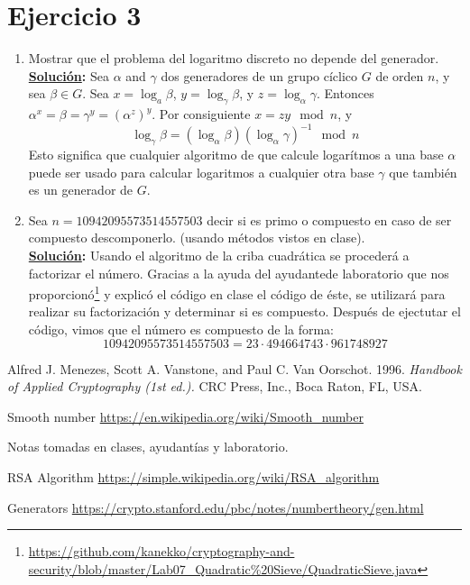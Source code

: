 \documentclass[11pt,letterpaper]{article}
\newcommand{\sol}{\textbf{\underline{Solución}: }} %
\begin{document}
\section{Ejercicio 3}

\begin{enumerate}[label=\alph*)]
\item Mostrar que el problema del logaritmo discreto no depende del generador.\\
\sol Sea $\alpha$ and $\gamma$ dos generadores de un grupo cíclico $G$ de orden $n$, 
y sea $\beta \in G$. Sea $x=\log_a \beta$, $y=\log_\gamma \beta$, y $z = \log_\alpha \gamma$.
Entonces $\alpha^x = \beta = \gamma^y = (\alpha^z)^y$. Por consiguiente $x = zy \mod{n}$, y 
$$\log_\gamma \beta = (\log_\alpha \beta)(\log_\alpha \gamma)^{-1} \mod{n}$$
Esto significa que cualquier algoritmo de que calcule logarítmos a una base $\alpha$ puede ser
usado para calcular logaritmos a cualquier otra base $\gamma$ que también es un generador de $G$.

\item Sea $n = 10942095573514557503$ decir si es primo o compuesto en caso de ser
compuesto descomponerlo. (usando métodos vistos en clase).\\
\sol Usando el algoritmo de la criba cuadrática se procederá a factorizar el número.
Gracias a la ayuda del ayudantede laboratorio que nos proporcionó\footnote{
\url{https://github.com/kanekko/cryptography-and-security/blob/master/Lab07_Quadratic\%20Sieve/QuadraticSieve.java}}
y explicó el código en clase el código de éste, se utilizará para realizar su factorización y determinar si es
compuesto. Después de ejectutar el código, vimos que el número es compuesto de la forma:
$$10942095573514557503 = 23 \cdot 494664743 \cdot 961748927$$

\end{enumerate}



\begin{thebibliography}{}

\bibitem{}
Alfred J. Menezes, Scott A. Vanstone, and Paul C. Van Oorschot. 1996.
\textit{Handbook of Applied Cryptography (1st ed.).}
CRC Press, Inc., Boca Raton, FL, USA.

\bibitem{}
Smooth number
\url{https://en.wikipedia.org/wiki/Smooth_number}

\bibitem{}
Notas tomadas en clases, ayudantías y laboratorio.

\bibitem{}
RSA Algorithm
\url{https://simple.wikipedia.org/wiki/RSA_algorithm}

\bibitem{}
Generators
\url{https://crypto.stanford.edu/pbc/notes/numbertheory/gen.html}


\end{thebibliography}
\end{document}
